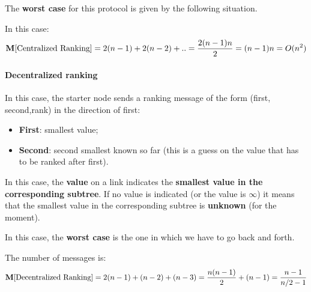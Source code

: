 
The \textbf{worst case} for this protocol is given by the following situation.


In this case:
$$
\mathbf{M}[\text{Centralized Ranking}] = 2(n-1) + 2(n-2) + .. = \frac{2(n-1)n}{2} = (n-1)n = O(n^2)
$$

\paragraph{Decentralized ranking}
In this case, the starter node sends a ranking message of the form (first, second,rank) in the direction of first:

\begin{itemize}
    \item \textbf{First}: smallest value;
    \item \textbf{Second}: second smallest known so far (this is a guess on the value that has to be ranked after first).
\end{itemize}


In this case, the \textbf{value} on a link indicates the \textbf{smallest value in the corresponding subtree}. If no value is indicated (or the value is $\infty$) it means that the smallest value in the corresponding subtree is \textbf{unknown} (for the moment).


In this case, the \textbf{worst case} is the one in which we have to go back and forth. 


The number of messages is:
$$
\mathbf{M}[\text{Decentralized Ranking}] = 2(n-1) + (n-2) + (n-3) = \frac{n(n-1)}{2} + (n-1) = \frac{n-1}{n/2 - 1}
$$

\newpage
